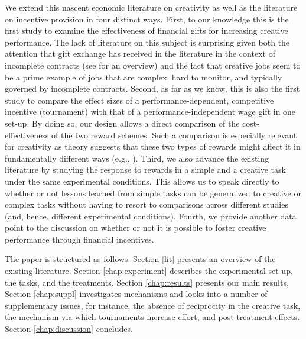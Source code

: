 We extend this nascent economic literature on creativity as well as the literature
 on incentive provision in four distinct ways.
First, to our knowledge this is the first study to examine the effectiveness of 
financial gifts for increasing creative performance. The lack of literature on this subject is surprising given both the 
attention that gift exchange has received in the literature in the context of 
incomplete contracts (see \citealp{Fehr00JEP} for an overview) and the fact that
creative jobs seem to be a prime example of jobs that are complex, hard to monitor, and 
typically governed by incomplete contracts. 
Second, as far as we know, this is also the first study to compare 
the effect sizes of a performance-dependent, competitive incentive (tournament) with  that of a 
performance-independent wage gift in one set-up. By doing so, our design allows a direct comparison of 
the cost-effectiveness of the two reward schemes. Such a comparison is especially relevant for 
creativity as theory suggests that these two types of rewards 
might affect it in fundamentally different ways (e.g., \citealp{byron12}).
Third, we also advance the existing literature by studying the response to rewards in a 
simple and a creative task under the same experimental conditions. This allows us to speak directly to 
whether or not lessons learned from simple tasks can be generalized to creative or complex tasks without 
having to resort to comparisons across different studies (and, hence, different experimental conditions).
Fourth, we provide another data point to the discussion on whether or not it is possible to foster
 creative performance through financial incentives. 


The paper is structured as follows. Section \ref{lit} presents an overview of the existing literature. Section \ref{chap:experiment} 
describes the experimental set-up, the tasks, and the treatments. 
Section \ref{chap:results} presents our main results, Section \ref{chap:suppl} investigates mechanisms and looks into a number of 
supplementary issues, for instance, the absence of reciprocity in the creative task, the mechanism via which tournaments increase effort, and post-treatment effects.
Section \ref{chap:discussion} concludes.

